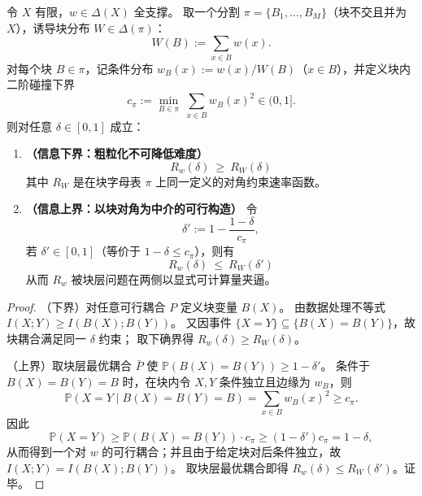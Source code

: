 \begin{theorem}\label{thm:pom-diagonal-rate-coarsegraining-bounds}
令 \(X\) 有限，\(w\in\Delta(X)\) 全支撑。
取一个分割 \(\pi=\{B_1,\dots,B_M\}\)（块不交且并为 \(X\)），诱导块分布 \(W\in\Delta(\pi)\)：
\[
W(B):=\sum_{x\in B}w(x).
\]
对每个块 \(B\in\pi\)，记条件分布 \(w_B(x):=w(x)/W(B)\)（\(x\in B\)），并定义块内二阶碰撞下界
\[
c_\pi:=\min_{B\in\pi}\ \sum_{x\in B} w_B(x)^2\in(0,1].
\]
则对任意 \(\delta\in[0,1]\) 成立：
\begin{enumerate}
  \item \textbf{（信息下界：粗粒化不可降低难度）}
  \[
  \boxed{\;R_w(\delta)\ \ge\ R_W(\delta)\;}
  \]
  其中 \(R_W\) 是在块字母表 \(\pi\) 上同一定义的对角约束速率函数。

  \item \textbf{（信息上界：以块对角为中介的可行构造）}
  令
  \[
  \delta':=1-\frac{1-\delta}{c_\pi},
  \]
  若 \(\delta'\in[0,1]\)（等价于 \(1-\delta\le c_\pi\)），则有
  \[
  \boxed{\;R_w(\delta)\ \le\ R_W(\delta')\;}
  \]
  从而 \(R_w\) 被块层问题在两侧以显式可计算量夹逼。
\end{enumerate}
\end{theorem}
\begin{proof}
（下界）对任意可行耦合 \(P\) 定义块变量 \(B(X)\)。
由数据处理不等式 \(I(X;Y)\ge I(B(X);B(Y))\)。
又因事件 \(\{X=Y\}\subseteq\{B(X)=B(Y)\}\)，故块耦合满足同一 \(\delta\) 约束；
取下确界得 \(R_w(\delta)\ge R_W(\delta)\)。
\par
（上界）取块层最优耦合 \(\bar P\) 使 \(\mathbb P(B(X)=B(Y))\ge 1-\delta'\)。
条件于 \(B(X)=B(Y)=B\) 时，在块内令 \(X,Y\) 条件独立且边缘为 \(w_B\)，则
\[
\mathbb P(X=Y\mid B(X)=B(Y)=B)=\sum_{x\in B}w_B(x)^2\ge c_\pi.
\]
因此
\[
\mathbb P(X=Y)\ge \mathbb P(B(X)=B(Y))\cdot c_\pi\ge (1-\delta')c_\pi=1-\delta,
\]
从而得到一个对 \(w\) 的可行耦合；并且由于给定块对后条件独立，故 \(I(X;Y)=I(B(X);B(Y))\)。
取块层最优耦合即得 \(R_w(\delta)\le R_W(\delta')\)。证毕。
\end{proof}

